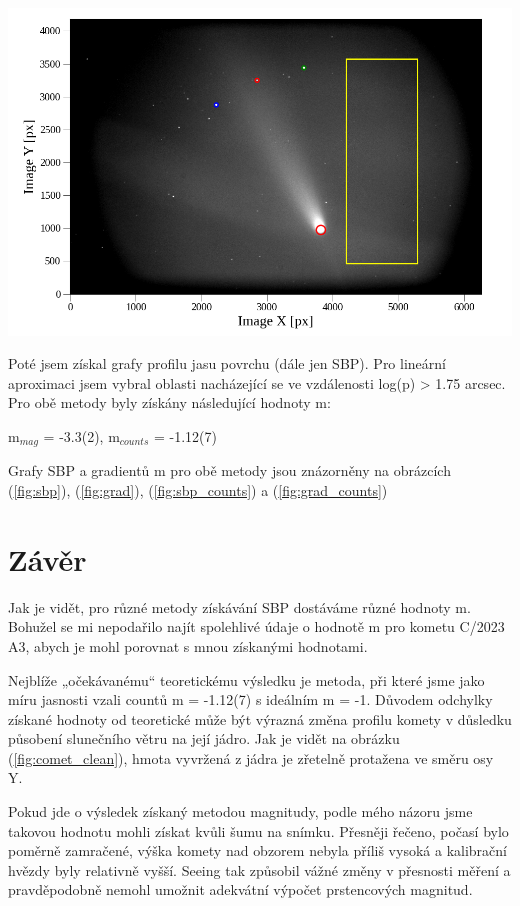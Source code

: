 \documentclass[a4paper,11pt]{article}
\begin{document}
    \begin{minipage}[t]{1\textwidth} 
        \vspace{0pt}   
        \par \centering
        \includegraphics[scale=0.6]{comet.png}
        \captionsetup{justification=centering, font=footnotesize}
        \label{fig:comet}
        \vspace{10pt}
        \raggedright 
    \end{minipage}
        Poté jsem získal grafy profilu jasu povrchu (dále jen SBP). Pro lineární aproximaci jsem vybral oblasti nacházející se ve vzdálenosti log(p) > 1.75 arcsec. Pro obě metody byly získány následující hodnoty m:
        \begin{center}
            m$_{mag}$ = -3.3(2), m$_{counts}$ = -1.12(7)
        \end{center}
        Grafy SBP a gradientů m pro obě metody jsou znázorněny na obrázcích (\ref{fig:sbp}), (\ref{fig:grad}), (\ref{fig:sbp_counts}) a (\ref{fig:grad_counts})

    \section{Závěr}
        Jak je vidět, pro různé metody získávání SBP dostáváme různé hodnoty m. Bohužel se mi nepodařilo najít spolehlivé údaje o hodnotě m pro kometu C/2023 A3, abych je mohl porovnat s mnou získanými hodnotami. 
        \par Nejblíže „očekávanému“ teoretickému výsledku je metoda, při které jsme jako míru jasnosti vzali countů m = -1.12(7) s ideálním m = -1. Důvodem odchylky získané hodnoty od teoretické může být výrazná změna profilu komety v důsledku působení slunečního větru na její jádro. Jak je vidět na obrázku (\ref{fig:comet_clean}), hmota vyvržená z jádra je zřetelně protažena ve směru osy Y. 
        \par Pokud jde o výsledek získaný metodou magnitudy, podle mého názoru jsme takovou hodnotu mohli získat kvůli šumu na snímku. Přesněji řečeno, počasí bylo poměrně zamračené, výška komety nad obzorem nebyla příliš vysoká a kalibrační hvězdy byly relativně vyšší. Seeing tak způsobil vážné změny v přesnosti měření a pravděpodobně nemohl umožnit adekvátní výpočet prstencových magnitud. 
\end{document}
